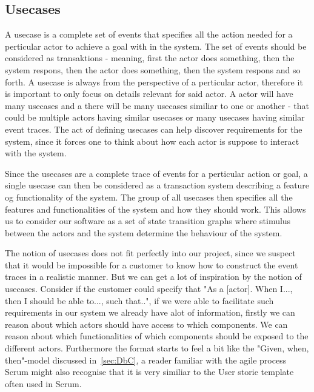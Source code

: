 \subsection{Usecases}
A usecase is a complete set of events that specifies all the action needed for a perticular actor to achieve a goal with in the system. 
The set of events should be considered as transaktions - meaning, first the actor does something, then the system respons, then the actor does something, then the system respons and so forth. 
A usecase is always from the perspective of a perticular actor, therefore it is important to only focus on details relevant for said actor. 
A actor will have many usecases and a there will be many usecases similiar to one or another - that could be multiple actors having similar usecases or many usecases having similar event traces. 
The act of defining usecases can help discover requirements for the system, since it forces one to think about how each actor is suppose to interact with the system.

Since the usecases are a complete trace of events for a perticular action or goal, a single usecase can then be considered as a transaction system describing a feature og functionality of the system. 
The group of all usecases then specifies all the features and functionalities of the system and how they should work. 
This allows us to consider our software as a set of state transition graphs where stimulus between the actors and the system determine the behaviour of the system.

The notion of usecases does not fit perfectly into our project, since we suspect that it would be impossible for a customer to know how to construct the event traces in a realistic manner. 
But we can get a lot of inspiration by the notion of usecases. 
Consider if the customer could specify that "As a [actor]. When I..., then I should be able to..., such that..", if we were able to facilitate such requirements in our system we already have alot of information, firstly we can reason about which actors should have access to which components.
We can reason about which functionalities of which components should be exposed to the different actors.
Furthermore the format starts to feel a bit like the "Given, when, then"-model discussed in~\autoref{sec:DbC}, a reader familiar with the agile process Scrum might also recognise that it is very similiar to the User storie template often used in Scrum.
